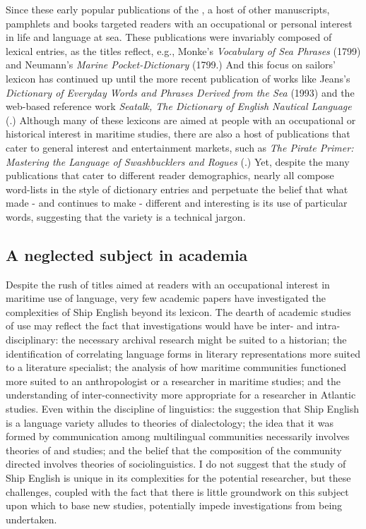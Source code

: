 Since these early popular publications of the , a host of other manuscripts, pamphlets and books targeted readers with an occupational or personal interest in life and language at sea. These publications were invariably composed of lexical entries, as the titles reflect, e.g., Monke’s \textit{Vocabulary of Sea Phrases} (1799) and Neumann’s \textit{Marine Pocket-Dictionary} (1799.) And this focus on sailors’ lexicon has continued up until the more recent publication of works like Jeans’s \textit{Dictionary of Everyday Words and Phrases Derived from the Sea} (1993) and the web-based reference work \textit{Seatalk, The Dictionary of English Nautical Language} (\citealt{MacKenzie2005}.) Although many of these lexicons are aimed at people with an occupational or historical interest in maritime studies, there are also a host of publications that cater to general interest and entertainment markets, such as \textit{The Pirate Primer: Mastering the Language of Swashbucklers and Rogues} (\citealt{Choundas2007}.) Yet, despite the many publications that cater to different reader demographics, nearly all compose word-lists in the style of dictionary entries and perpetuate the belief that what made - and continues to make -  different and interesting is its use of particular words, suggesting that the variety is a technical jargon. 



\subsection{{A neglected subject in academia}}\label{sec:1.1.3}



Despite the rush of titles aimed at readers with an occupational interest in maritime use of language, very few academic papers have investigated the complexities of Ship English beyond its lexicon.  The dearth of academic studies of  use may reflect the fact that investigations would have be inter- and intra-disciplinary: the necessary archival research might be suited to a historian; the identification of correlating language forms in literary representations more suited to a literature specialist; the analysis of how maritime communities functioned more suited to an anthropologist or a researcher in maritime studies; and the understanding of inter-connectivity more appropriate for a researcher in Atlantic studies. Even within the discipline of linguistics: the suggestion that Ship English is a language variety alludes to theories of dialectology; the idea that it was formed by communication among multilingual communities necessarily involves theories of  and  studies; and the belief that the composition of the community directed  involves theories of sociolinguistics. I do not suggest that the study of Ship English is unique in its complexities for the potential researcher, but these challenges, coupled with the fact that there is little groundwork on this subject upon which to base new studies, potentially impede investigations from being undertaken. 



